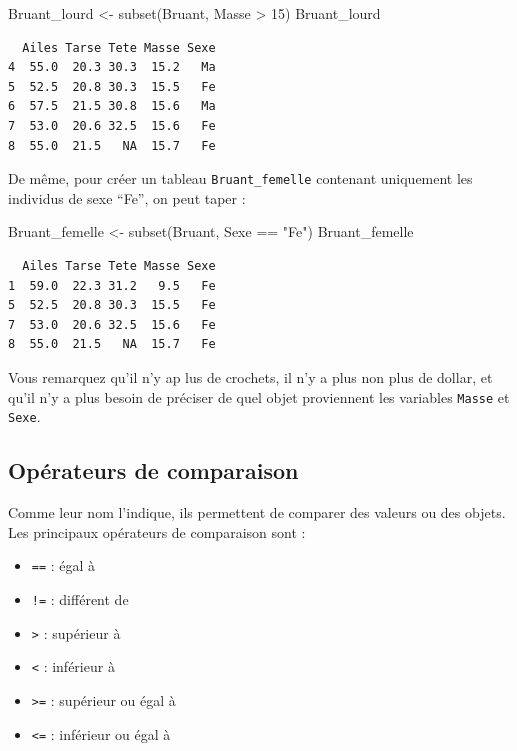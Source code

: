 \documentclass[
  a4paper,
  DIV=11,
  numbers=noendperiod,
  oneside]{scrreprt}
\newenvironment{Shaded}{}{}
\newcommand{\DecValTok}[1]{\textcolor[rgb]{0.00,0.36,0.77}{#1}}
\newcommand{\FunctionTok}[1]{\textcolor[rgb]{0.44,0.26,0.76}{#1}}
\newcommand{\NormalTok}[1]{\textcolor[rgb]{0.14,0.16,0.18}{#1}}
\newcommand{\OtherTok}[1]{\textcolor[rgb]{0.44,0.26,0.76}{#1}}
\newcommand{\SpecialCharTok}[1]{\textcolor[rgb]{0.00,0.36,0.77}{#1}}
\newcommand{\StringTok}[1]{\textcolor[rgb]{0.01,0.18,0.38}{#1}}
\providecommand{\tightlist}{%
  \setlength{\itemsep}{0pt}\setlength{\parskip}{0pt}}\usepackage{longtable,booktabs,array}
\begin{document}
\begin{Shaded}
\begin{Highlighting}[]
\NormalTok{Bruant\_lourd }\OtherTok{\textless{}{-}} \FunctionTok{subset}\NormalTok{(Bruant, Masse }\SpecialCharTok{\textgreater{}} \DecValTok{15}\NormalTok{)}
\NormalTok{Bruant\_lourd}
\end{Highlighting}
\end{Shaded}

\begin{verbatim}
  Ailes Tarse Tete Masse Sexe
4  55.0  20.3 30.3  15.2   Ma
5  52.5  20.8 30.3  15.5   Fe
6  57.5  21.5 30.8  15.6   Ma
7  53.0  20.6 32.5  15.6   Fe
8  55.0  21.5   NA  15.7   Fe
\end{verbatim}

De même, pour créer un tableau \texttt{Bruant\_femelle} contenant
uniquement les individus de sexe ``Fe'', on peut taper :

\begin{Shaded}
\begin{Highlighting}[]
\NormalTok{Bruant\_femelle }\OtherTok{\textless{}{-}} \FunctionTok{subset}\NormalTok{(Bruant, Sexe }\SpecialCharTok{==} \StringTok{"Fe"}\NormalTok{)}
\NormalTok{Bruant\_femelle}
\end{Highlighting}
\end{Shaded}

\begin{verbatim}
  Ailes Tarse Tete Masse Sexe
1  59.0  22.3 31.2   9.5   Fe
5  52.5  20.8 30.3  15.5   Fe
7  53.0  20.6 32.5  15.6   Fe
8  55.0  21.5   NA  15.7   Fe
\end{verbatim}

Vous remarquez qu'il n'y ap lus de crochets, il n'y a plus non plus de
dollar, et qu'il n'y a plus besoin de préciser de quel objet proviennent
les variables \texttt{Masse} et \texttt{Sexe}.

\subsection{Opérateurs de comparaison}\label{sec-comparaison}

Comme leur nom l'indique, ils permettent de comparer des valeurs ou des
objets. Les principaux opérateurs de comparaison sont :

\begin{itemize}
\tightlist
\item
  \texttt{==} : égal à
\item
  \texttt{!=} : différent de
\item
  \texttt{\textgreater{}} : supérieur à
\item
  \texttt{\textless{}} : inférieur à
\item
  \texttt{\textgreater{}=} : supérieur ou égal à
\item
  \texttt{\textless{}=} : inférieur ou égal à
\end{itemize}
\end{document}
